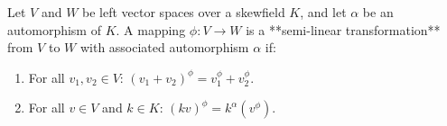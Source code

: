 Let $V$ and $W$ be left vector spaces over a skewfield $K$, and let $\alpha$ be an automorphism of $K$. A mapping $\phi \colon V \to W$ is a **semi-linear transformation** from $V$ to $W$ with associated automorphism $\alpha$ if:
\begin{enumerate}
\item[(i)] For all $v_1, v_2 \in V$: $(v_1 + v_2)^\phi = v_1^\phi + v_2^\phi$.
\item[(ii)] For all $v \in V$ and $k \in K$: $(kv)^\phi = k^\alpha (v^\phi)$.
\end{enumerate}
